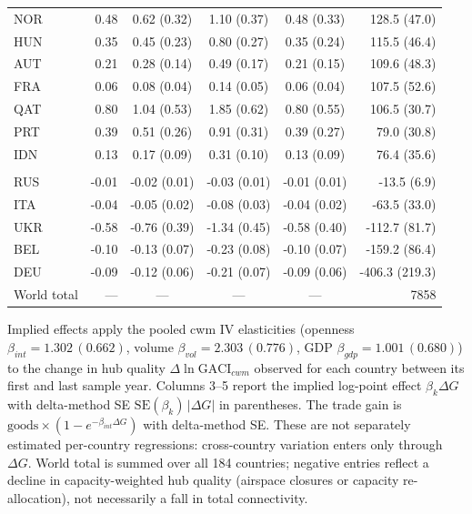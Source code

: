 \begin{table}[H]
\begin{threeparttable}
\begin{tabular}{lrcccr}
NOR & 0.48 & 0.62 (0.32) & 1.10 (0.37) & 0.48 (0.33) & 128.5 (47.0) \\
HUN & 0.35 & 0.45 (0.23) & 0.80 (0.27) & 0.35 (0.24) & 115.5 (46.4) \\
AUT & 0.21 & 0.28 (0.14) & 0.49 (0.17) & 0.21 (0.15) & 109.6 (48.3) \\
FRA & 0.06 & 0.08 (0.04) & 0.14 (0.05) & 0.06 (0.04) & 107.5 (52.6) \\
QAT & 0.80 & 1.04 (0.53) & 1.85 (0.62) & 0.80 (0.55) & 106.5 (30.7) \\
PRT & 0.39 & 0.51 (0.26) & 0.91 (0.31) & 0.39 (0.27) & 79.0 (30.8) \\
IDN & 0.13 & 0.17 (0.09) & 0.31 (0.10) & 0.13 (0.09) & 76.4 (35.6) \\
\addlinespace
\multicolumn{6}{l}{\emph{Connectivity decliners (bottom 5)}}\\
RUS & -0.01 & -0.02 (0.01) & -0.03 (0.01) & -0.01 (0.01) & -13.5 (6.9) \\
ITA & -0.04 & -0.05 (0.02) & -0.08 (0.03) & -0.04 (0.02) & -63.5 (33.0) \\
UKR & -0.58 & -0.76 (0.39) & -1.34 (0.45) & -0.58 (0.40) & -112.7 (81.7) \\
BEL & -0.10 & -0.13 (0.07) & -0.23 (0.08) & -0.10 (0.07) & -159.2 (86.4) \\
DEU & -0.09 & -0.12 (0.06) & -0.21 (0.07) & -0.09 (0.06) & -406.3 (219.3) \\
\midrule
World total & --- & --- & --- & --- & 7858 \\
\bottomrule
\end{tabular}
\begin{tablenotes}\scriptsize
\item Implied effects apply the pooled cwm IV elasticities (openness
$\beta_{int}=1.302\,(0.662)$, volume $\beta_{vol}=2.303\,(0.776)$, GDP
$\beta_{gdp}=1.001\,(0.680)$) to the change in hub quality
$\Delta\ln\mathrm{GACI}_{cwm}$ observed for each country between its first and
last sample year. Columns 3--5 report the implied log-point effect
$\beta_k\Delta G$ with delta-method SE $\mathrm{SE}(\beta_k)\,|\Delta G|$ in
parentheses. The trade gain is
$\text{goods}\times(1-e^{-\beta_{int}\Delta G})$ with delta-method SE. These are
not separately estimated per-country regressions: cross-country variation enters
only through $\Delta G$. World total is summed over all 184 countries; negative
entries reflect a decline in capacity-weighted hub quality (airspace closures or
capacity re-allocation), not necessarily a fall in total connectivity.
\end{tablenotes}
\end{threeparttable}
\end{table}

